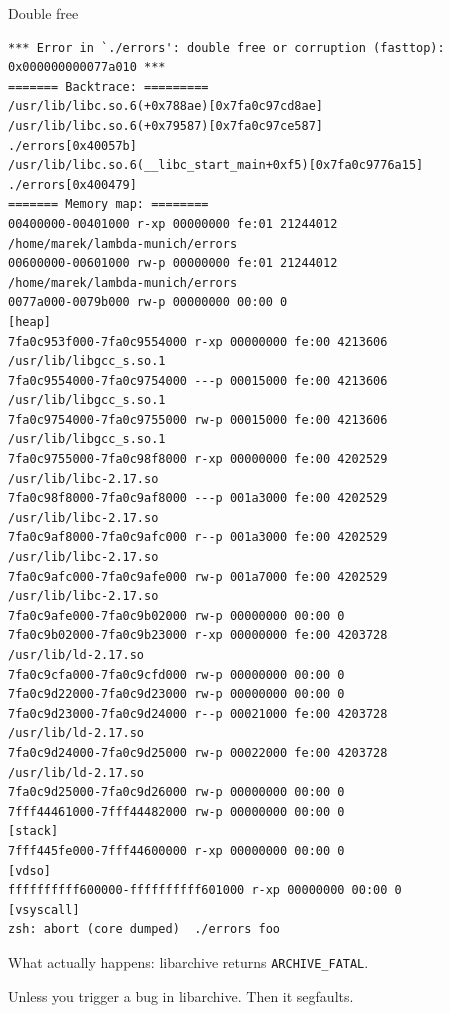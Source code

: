 \documentclass{beamer}
\begin{document}
\begin{frame}[fragile]{Double free}
\begin{verbatim}
*** Error in `./errors': double free or corruption (fasttop): 0x000000000077a010 ***
======= Backtrace: =========
/usr/lib/libc.so.6(+0x788ae)[0x7fa0c97cd8ae]
/usr/lib/libc.so.6(+0x79587)[0x7fa0c97ce587]
./errors[0x40057b]
/usr/lib/libc.so.6(__libc_start_main+0xf5)[0x7fa0c9776a15]
./errors[0x400479]
======= Memory map: ========
00400000-00401000 r-xp 00000000 fe:01 21244012                           /home/marek/lambda-munich/errors
00600000-00601000 rw-p 00000000 fe:01 21244012                           /home/marek/lambda-munich/errors
0077a000-0079b000 rw-p 00000000 00:00 0                                  [heap]
7fa0c953f000-7fa0c9554000 r-xp 00000000 fe:00 4213606                    /usr/lib/libgcc_s.so.1
7fa0c9554000-7fa0c9754000 ---p 00015000 fe:00 4213606                    /usr/lib/libgcc_s.so.1
7fa0c9754000-7fa0c9755000 rw-p 00015000 fe:00 4213606                    /usr/lib/libgcc_s.so.1
7fa0c9755000-7fa0c98f8000 r-xp 00000000 fe:00 4202529                    /usr/lib/libc-2.17.so
7fa0c98f8000-7fa0c9af8000 ---p 001a3000 fe:00 4202529                    /usr/lib/libc-2.17.so
7fa0c9af8000-7fa0c9afc000 r--p 001a3000 fe:00 4202529                    /usr/lib/libc-2.17.so
7fa0c9afc000-7fa0c9afe000 rw-p 001a7000 fe:00 4202529                    /usr/lib/libc-2.17.so
7fa0c9afe000-7fa0c9b02000 rw-p 00000000 00:00 0
7fa0c9b02000-7fa0c9b23000 r-xp 00000000 fe:00 4203728                    /usr/lib/ld-2.17.so
7fa0c9cfa000-7fa0c9cfd000 rw-p 00000000 00:00 0
7fa0c9d22000-7fa0c9d23000 rw-p 00000000 00:00 0
7fa0c9d23000-7fa0c9d24000 r--p 00021000 fe:00 4203728                    /usr/lib/ld-2.17.so
7fa0c9d24000-7fa0c9d25000 rw-p 00022000 fe:00 4203728                    /usr/lib/ld-2.17.so
7fa0c9d25000-7fa0c9d26000 rw-p 00000000 00:00 0
7fff44461000-7fff44482000 rw-p 00000000 00:00 0                          [stack]
7fff445fe000-7fff44600000 r-xp 00000000 00:00 0                          [vdso]
ffffffffff600000-ffffffffff601000 r-xp 00000000 00:00 0                  [vsyscall]
zsh: abort (core dumped)  ./errors foo
\end{verbatim}
\end{frame}

\begin{frame}
  What actually happens: libarchive returns \texttt{ARCHIVE\_FATAL}.\pause

  Unless you trigger a bug in libarchive. \pause
  \alert{Then it segfaults.}
\end{frame}
\end{document}
